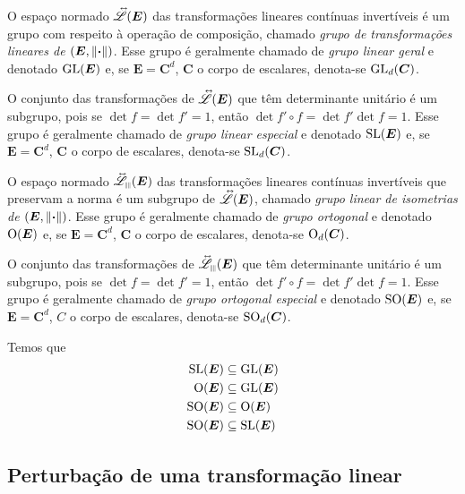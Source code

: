 O espaço normado $\accentset{\leftrightarrow}{\mathscr{L}}(\bm E)$ das transformações lineares contínuas invertíveis é um grupo com respeito à operação de composição, chamado \emph{grupo de transformações lineares de $(\bm E,\left\Vert{\bm{\cdot}}\right\Vert)$}. Esse grupo é geralmente chamado de \emph{grupo linear geral} e denotado $\operatorname{GL}(\bm E)$ e, se $\bm E = \bm C^d$, $\bm C$ o corpo de escalares, denota-se $\operatorname{GL}_d(\bm C)$.

O conjunto das transformações de $\accentset{\leftrightarrow}{\mathscr{L}}(\bm E)$ que têm determinante unitário é um subgrupo, pois se $\det{f}=\det{f'}=1$, então $\det{f' \circ f}=\det{f'}\det{f}=1$. Esse grupo é geralmente chamado de \emph{grupo linear especial} e denotado $\operatorname{SL}(\bm E)$ e, se $\bm E = \bm C^d$, $\bm C$ o corpo de escalares, denota-se $\operatorname{SL}_d(\bm C)$.

O espaço normado $\Iso{\Linmet}(\bm E)$ das transformações lineares contínuas invertíveis que preservam a norma é um subgrupo de $\accentset{\leftrightarrow}{\mathscr{L}}(\bm E)$, chamado \emph{grupo linear de isometrias de $(\bm E,\left\Vert{\bm{\cdot}}\right\Vert)$}. Esse grupo é geralmente chamado de \emph{grupo ortogonal} e denotado $\operatorname{O}(\bm E)$ e, se $\bm E = \bm C^d$, $\bm C$ o corpo de escalares, denota-se $\operatorname{O}_d(\bm C)$.

O conjunto das transformações de $\Iso{\Linmet}(\bm E)$ que têm determinante unitário é um subgrupo, pois se $\det{f}=\det{f'}=1$, então $\det{f' \circ f}=\det{f'}\det{f}=1$. Esse grupo é geralmente chamado de \emph{grupo ortogonal especial} e denotado $\operatorname{SO}(\bm E)$ e, se $\bm E = \bm C^d$, $C$ o corpo de escalares, denota-se $\operatorname{SO}_d(\bm C)$.

Temos que
	\begin{align*}
	\operatorname{SL}(\bm E) &\subseteq \operatorname{GL}(\bm E) \\
	\operatorname{O}(\bm E) &\subseteq \operatorname{GL}(\bm E) \\
	\operatorname{SO}(\bm E) &\subseteq \operatorname{O}(\bm E) \\
	\operatorname{SO}(\bm E) &\subseteq \operatorname{SL}(\bm E)
	\end{align*}


\subsection{Perturbação de uma transformação linear}

